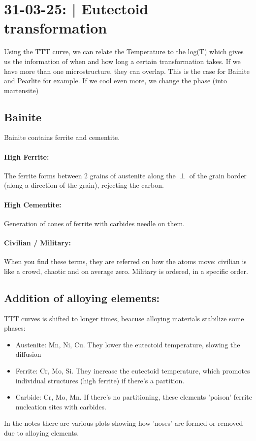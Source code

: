 \section{31-03-25: | Eutectoid transformation}

Using the TTT curve, we can relate the Temperature to the log(T) which gives us the information of when and how long a certain transformation takes. If we have more than one microstructure, they can overlap. This is the case for Bainite and Pearlite for example. If we cool even more, we change the phase (into martensite)

\subsection{Bainite}
Bainite contains ferrite and cementite.
\paragraph{High Ferrite:} The ferrite forms between 2 grains of austenite along the $\perp$ of the grain border (along a direction of the grain), rejecting the carbon.
\paragraph{High Cementite:} Generation of cones of ferrite with carbides needle on them.

\paragraph{Civilian / Military:} When you find these terms, they are referred on how the atoms move: civilian is like a crowd, chaotic and on average zero. Military is ordered, in a specific order.

\subsection{Addition of alloying elements:} TTT curves is shifted to longer times, beacuse alloying materials stabilize some phases:

\begin{itemize}
    \item Austenite: Mn, Ni, Cu. They lower the eutectoid temperature, slowing the diffusion
    \item Ferrite: Cr, Mo, Si. They increase the eutectoid temperature, which promotes individual structures (high ferrite) if there's a partition.
    \item Carbide: Cr, Mo, Mn. If there's no partitioning, these elements 'poison' ferrite nucleation sites with carbides.
\end{itemize}
In the notes there are various plots showing how 'noses' are formed or removed due to alloying elements.

